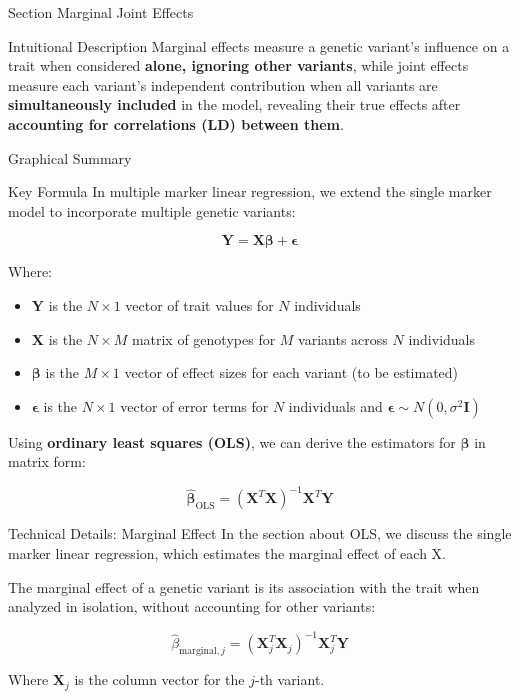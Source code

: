 
\begin{frame}{Section}
\centering
\Huge{Marginal Joint Effects}
\end{frame}


\begin{frame}{Intuitional Description}
Marginal effects measure a genetic variant's influence on a trait when considered \textbf{alone, ignoring other variants}, while joint effects measure each variant's independent contribution when all variants are \textbf{simultaneously included} in the model, revealing their true effects after \textbf{accounting for correlations (LD) between them}.
\end{frame}

\begin{frame}{Graphical Summary}

\end{frame}


\begin{frame}{Key Formula}
In multiple marker linear regression, we extend the single marker model to incorporate multiple genetic variants:

$$
\mathbf{Y} = \mathbf{X} \boldsymbol{\beta} + \boldsymbol{\epsilon}
$$

Where:
\begin{itemize}
\item $\mathbf{Y}$ is the $N \times 1$ vector of trait values for $N$ individuals
\item $\mathbf{X}$ is the $N \times M$ matrix of genotypes for $M$ variants across $N$ individuals
\item $\boldsymbol{\beta}$ is the $M \times 1$ vector of effect sizes for each variant (to be estimated)
\item $\boldsymbol{\epsilon}$ is the $N \times 1$ vector of error terms for $N$ individuals and $\boldsymbol{\epsilon} \sim N(0, \sigma^2\mathbf{I})$
\end{itemize}

Using \textbf{ordinary least squares (OLS)}, we can derive the estimators for $\boldsymbol{\beta}$ in matrix form:

$$
\hat{\boldsymbol{\beta}}_{\text{OLS}} = (\mathbf{X}^T\mathbf{X})^{-1}\mathbf{X}^T\mathbf{Y}
$$

\end{frame}


\begin{frame}{Technical Details: Marginal Effect}
In the section about OLS, we discuss the single marker linear regression, which estimates the marginal effect of each X.

The marginal effect of a genetic variant is its association with the trait when analyzed in isolation, without accounting for other variants:

$$
\hat{\beta}_{\text{marginal},j} = (\mathbf{X}_j^T\mathbf{X}_j)^{-1}\mathbf{X}_j^T\mathbf{Y}
$$

Where $\mathbf{X}_j$ is the column vector for the $j$-th variant.

\end{frame}

